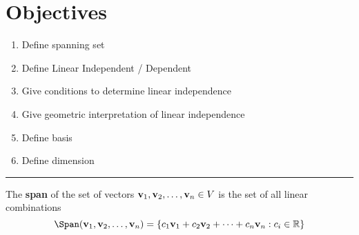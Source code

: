 %




\section*{Objectives}
\begin{enumerate}
	\item Define spanning set
	\item Define Linear Independent / Dependent
	\item Give conditions to determine linear independence
	\item Give geometric interpretation of linear independence
	\item Define basis
	\item Define dimension
    
\end{enumerate}



 
 
  

\rule[0.01in]{\textwidth}{0.0025in}


 
 
 
 

\begin{tcolorbox}[colback=yellow!10!,colframe=gray!15!]
	\begin{definition}
		The \textbf{span} of the set of vectors ${\bf v}_1, {\bf v}_2,  \dots, {\bf v}_n \in V$ is the set of all linear combinations 
\[ \Span({\bf v}_1, {\bf v}_2,  \dots, {\bf v}_n) = \{ c_1 {\bf v}_1 + c_2 {\bf v}_2 + \cdots + c_n {\bf v}_n : c_i \in \mathbb{R} \} \]

 	\end{definition}
	 
\end{tcolorbox}





